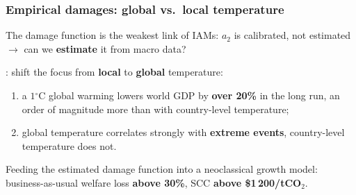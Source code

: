\documentclass[xcolor=x11names,compress,aspectratio=169]{beamer}%
\makeatletter
\providecommand{\U}[1]{\protect\rule{.1in}{.1in}}
\newenvironment{stepenumeratewithalert}{\begin{enumerate}[<+-| alert@+>]}{\end{enumerate}}
\newenvironment{stepitemizewithalert}{\begin{itemize}[<+-| alert@+>]}{\end{itemize} }
\renewenvironment{itemize}{\begin{compactitemize}[<+-| alert@+>]}{\end{compactitemize}}
\renewenvironment{stepitemizewithalert}{\begin{compactitemize}[<+-| alert@+>]}{\end{compactitemize}}
\renewenvironment{stepitemizewithalert}{\begin{itemize}}{\end{itemize}}
\renewenvironment{stepenumeratewithalert}{\begin{enumerate}}{\end{enumerate}}
\makeatother
\begin{document}
\begin{frame}%
%

\frametitle{Empirical damages: global vs.\ local temperature}%


\begin{stepitemizewithalert}
\item The damage function is the weakest link of IAMs: $a_{2}$ is calibrated, not
estimated $\rightarrow$ can we \textbf{estimate} it from macro data?%
\vspace{1.5ex}%


\item \cite{bilal2026macroeconomic}: shift the focus from \textbf{local} to
\textbf{global} temperature:
\begin{stepenumeratewithalert}
\item a $1%
{{}^\circ}%
$C global warming lowers world GDP by \textbf{over 20\%} in the long run,
an order of magnitude more than with country-level temperature;%
\vspace{1ex}%


\item global temperature correlates strongly with \textbf{extreme events},
country-level temperature does not.
\end{stepenumeratewithalert}%
\vspace{1.5ex}%


\item Feeding the estimated damage function into a neoclassical growth model:
business-as-usual welfare loss \textbf{above 30\%}, SCC \textbf{above
\$1\,200/tCO$_{2}$}.
\end{stepitemizewithalert}

%

\transboxout
\end{frame}%
%
\end{document}
